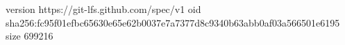version https://git-lfs.github.com/spec/v1
oid sha256:fc95f01efbc65630e65e62b0037e7a7377d8c9340b63abb0af03a566501e6195
size 699216
